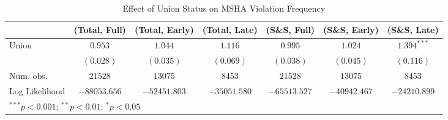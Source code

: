 
\begin{table}[H]
\begin{center}
\begin{tabular}{l c c c c c c}
\hline
 & (Total, Full) & (Total, Early) & (Total, Late) & (S\&S, Full) & (S\&S, Early) & (S\&S, Late) \\
\hline
Union          & $0.953$      & $1.044$      & $1.116$      & $0.995$      & $1.024$      & $1.394^{***}$ \\
               & $(0.028)$    & $(0.035)$    & $(0.069)$    & $(0.038)$    & $(0.045)$    & $(0.116)$     \\
\hline
Num. obs.      & $21528$      & $13075$      & $8453$       & $21528$      & $13075$      & $8453$        \\
Log Likelihood & $-88053.656$ & $-52451.803$ & $-35051.580$ & $-65513.527$ & $-40942.467$ & $-24210.899$  \\
\hline
\multicolumn{7}{l}{\scriptsize{$^{***}p<0.001$; $^{**}p<0.01$; $^{*}p<0.05$}}
\end{tabular}
\caption{Effect of Union Status on MSHA Violation Frequency}
\label{irr_100employees_violations}
\end{center}
\end{table}

